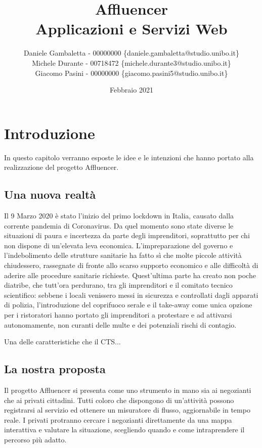 \documentclass[a4paper]{report}
\title{
    Affluencer \\
    \large Applicazioni e Servizi Web
}
\author{
    Daniele Gambaletta - 00000000 \{daniele.gambaletta@studio.unibo.it\} 
    \\
    Michele Durante - 00718472 \{michele.durante3@studio.unibo.it\}
    \\
    Giacomo Pasini - 00000000 \{giacomo.pasini5@studio.unibo.it\}
}
\date{Febbraio 2021}
\begin{document}
\maketitle

\pagebreak

\tableofcontents

\pagebreak

\chapter{Introduzione}

In questo capitolo verranno esposte le idee e le intenzioni che hanno portato alla realizzazione del progetto Affluencer. 

\section{Una nuova realtà}

Il 9 Marzo 2020 è stato l'inizio del primo lockdown in Italia, causato dalla corrente pandemia di Coronavirus.
%
Da quel momento sono state diverse le situazioni di paura e incertezza da parte degli imprenditori, soprattutto per chi non dispone di un'elevata leva economica.
%
L'impreparazione del governo e l'indebolimento delle strutture sanitarie ha fatto sì che molte piccole attività chiudessero, rassegnate di fronte allo scarso supporto economico e alle difficoltà di aderire alle procedure sanitarie richieste.
%
Quest'ultima parte ha creato non poche diatribe, che tutt'ora perdurano, tra gli imprenditori e il comitato tecnico scientifico: sebbene i locali venissero messi in sicurezza e controllati dagli apparati di polizia, l'introduzione del coprifuoco serale e il take-away come unica opzione per i ristoratori hanno portato gli imprenditori a protestare e ad attivarsi autonomamente, non curanti delle multe e dei potenziali rischi di contagio.

Una delle caratteristiche che il CTS...

\section{La nostra proposta}

Il progetto Affluencer si presenta come uno strumento in mano sia ai negozianti che ai privati cittadini. 
%
Tutti coloro che dispongono di un'attività possono registrarsi al servizio ed ottenere un misuratore di flusso, aggiornabile in tempo reale.
%
I privati protranno cercare i negozianti  direttamente da una mappa interattiva e valutare la situazione, scegliendo quando e come intraprendere il percorso più adatto.
\end{document}
